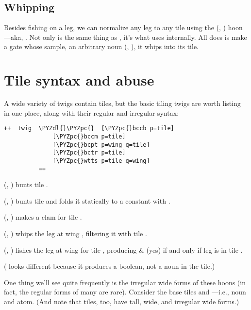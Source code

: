 \subsection{Whipping}

Besides fishing on a leg, we can normalize any leg to any tile
using the  (, ) hoon---aka, .  Not only
is  the same thing as , it's what  uses
internally. All  does is make a gate whose sample, an 
arbitrary noun \kode{+\textless{}} (, ), it whips into its tile.

\section{Tile syntax and abuse}

A wide variety of twigs contain tiles, but the basic tiling twigs
are worth listing in one place, along with their regular and
irregular syntax:

\begin{framed_shaded}
\begin{Verbatim}[fontsize=\relsize{-2.5},fontseries=b,commandchars=\\\{\}]
++  twig  \PYZdl{}\PYZpc{}  [\PYZpc{}bccb p=tile]
              [\PYZpc{}bccm p=tile]
              [\PYZpc{}bcpt p=wing q=tile]
              [\PYZpc{}bctr p=tile]
              [\PYZpc{}wtts p=tile q=wing]
          ==
\end{Verbatim}
\end{framed_shaded}
\kode{\$\_} (, ) bunts tile .

\kode{\$*} (, ) bunts tile  and folds it statically
to a constant with .

\kode{\$,} (, ) makes a clam for tile .

 (, ) whips the leg at wing , filtering it
with tile .

 (, ) fishes the leg at wing  for tile ,
producing \& (yes) if and only if leg  is in tile .

( looks different because it produces a boolean, not a
noun in the tile.)

One thing we'll see quite frequently is the irregular wide forms
of these hoons (in fact, the regular forms of many are rare).
Consider the base tiles \kode{*} and ---i.e., noun and atom.  (And
note that tiles, too, have tall, wide, and irregular wide forms.)

